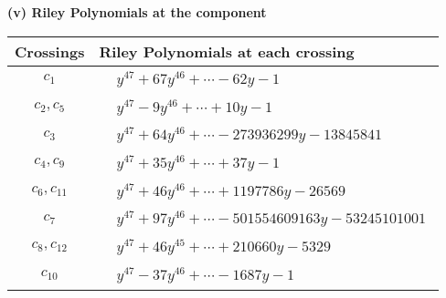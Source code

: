 \documentclass[1p]{elsarticle_modified}
\theoremstyle{definition}
\begin{document}
\newpage\renewcommand{\arraystretch}{1}
\flushleft \textbf{(v) Riley Polynomials at the component}\newline \\
\begin{tabular}{m{50pt}|m{274pt}}
Crossings & \hspace{64pt}Riley Polynomials at each crossing \\
\hline $$\begin{aligned}c_{1}\end{aligned}$$&$\begin{aligned}
&y^{47}+67 y^{46}+\cdots-62 y-1
\end{aligned}$\\
\hline $$\begin{aligned}c_{2},c_{5}\end{aligned}$$&$\begin{aligned}
&y^{47}-9 y^{46}+\cdots+10 y-1
\end{aligned}$\\
\hline $$\begin{aligned}c_{3}\end{aligned}$$&$\begin{aligned}
&y^{47}+64 y^{46}+\cdots-273936299 y-13845841
\end{aligned}$\\
\hline $$\begin{aligned}c_{4},c_{9}\end{aligned}$$&$\begin{aligned}
&y^{47}+35 y^{46}+\cdots+37 y-1
\end{aligned}$\\
\hline $$\begin{aligned}c_{6},c_{11}\end{aligned}$$&$\begin{aligned}
&y^{47}+46 y^{46}+\cdots+1197786 y-26569
\end{aligned}$\\
\hline $$\begin{aligned}c_{7}\end{aligned}$$&$\begin{aligned}
&y^{47}+97 y^{46}+\cdots-501554609163 y-53245101001
\end{aligned}$\\
\hline $$\begin{aligned}c_{8},c_{12}\end{aligned}$$&$\begin{aligned}
&y^{47}+46 y^{45}+\cdots+210660 y-5329
\end{aligned}$\\
\hline $$\begin{aligned}c_{10}\end{aligned}$$&$\begin{aligned}
&y^{47}-37 y^{46}+\cdots-1687 y-1
\end{aligned}$\\
\hline
\end{tabular}\\~\\
\end{document}
